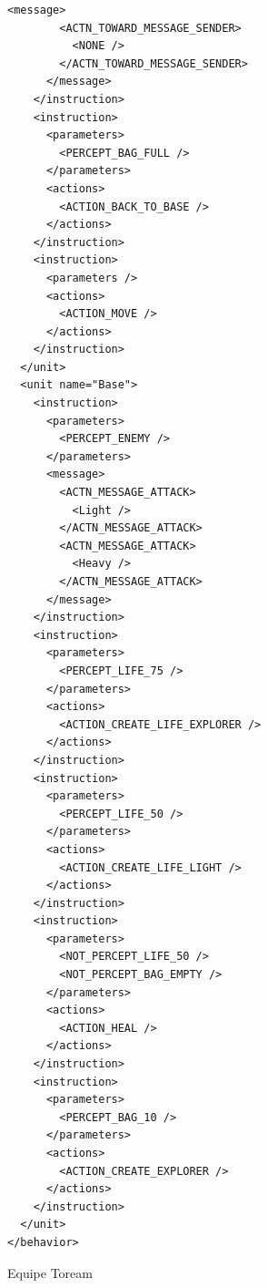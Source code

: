 \documentclass{report}
\begin{document}
\begin{lstlisting}[frame=single]
      <message>
        <ACTN_TOWARD_MESSAGE_SENDER>
          <NONE />
        </ACTN_TOWARD_MESSAGE_SENDER>
      </message>
    </instruction>
    <instruction>
      <parameters>
        <PERCEPT_BAG_FULL />
      </parameters>
      <actions>
        <ACTION_BACK_TO_BASE />
      </actions>
    </instruction>
    <instruction>
      <parameters />
      <actions>
        <ACTION_MOVE />
      </actions>
    </instruction>
  </unit>
  <unit name="Base">
    <instruction>
      <parameters>
        <PERCEPT_ENEMY />
      </parameters>
      <message>
        <ACTN_MESSAGE_ATTACK>
          <Light />
        </ACTN_MESSAGE_ATTACK>
        <ACTN_MESSAGE_ATTACK>
          <Heavy />
        </ACTN_MESSAGE_ATTACK>
      </message>
    </instruction>
    <instruction>
      <parameters>
        <PERCEPT_LIFE_75 />
      </parameters>
      <actions>
        <ACTION_CREATE_LIFE_EXPLORER />
      </actions>
    </instruction>
    <instruction>
      <parameters>
        <PERCEPT_LIFE_50 />
      </parameters>
      <actions>
        <ACTION_CREATE_LIFE_LIGHT />
      </actions>
    </instruction>
    <instruction>
      <parameters>
        <NOT_PERCEPT_LIFE_50 />
        <NOT_PERCEPT_BAG_EMPTY />
      </parameters>
      <actions>
        <ACTION_HEAL />
      </actions>
    </instruction>
    <instruction>
      <parameters>
        <PERCEPT_BAG_10 />
      </parameters>
      <actions>
        <ACTION_CREATE_EXPLORER />
      </actions>
    </instruction>
  </unit>
</behavior>
\end{lstlisting}
 {Equipe Toream}
\end{document}
